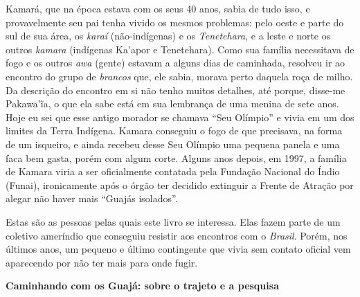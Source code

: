 Kamará, que na época estava com os seus 40 anos, sabia de tudo isso, e
provavelmente seu pai tenha vivido os mesmos problemas: pelo oeste e
parte do sul de sua área, os \emph{karaí} (não-indígenas) e os
\emph{Tenetehara}, e a leste e norte os outros \emph{kamara} (indígenas
Ka'apor e Tenetehara). Como sua família necessitava de fogo e os outros
\emph{awa} (gente) estavam a alguns dias de caminhada, resolveu ir ao
encontro do grupo de \emph{brancos} que, ele sabia, morava perto daquela
roça de milho. Da descrição do encontro em si não tenho muitos detalhes,
até porque, disse-me Pakawa'ĩa, o que ela sabe está em sua lembrança de
uma menina de sete anos. Hoje eu sei que esse antigo morador se chamava
``Seu Olímpio'' e vivia em um dos limites da Terra Indígena. Kamara
conseguiu o fogo de que precisava, na forma de um isqueiro, e ainda
recebeu desse Seu Olímpio uma pequena panela e uma faca bem gasta, porém
com algum corte. Alguns anos depois, em 1997, a família de Kamara viria
a ser oficialmente contatada pela Fundação Nacional do Índio (Funai),
ironicamente após o órgão ter decidido extinguir a Frente de Atração por
alegar não haver mais ``Guajás isolados''.

Estas são as pessoas pelas quais este livro se interessa. Elas fazem
parte de um coletivo ameríndio que conseguiu resistir aos encontros com
o \emph{Brasil}. Porém, nos últimos anos, um pequeno e último
contingente que vivia sem contato oficial vem aparecendo por não ter
mais para onde fugir.

\textbf{Caminhando com os Guajá: sobre o trajeto e a pesquisa}

